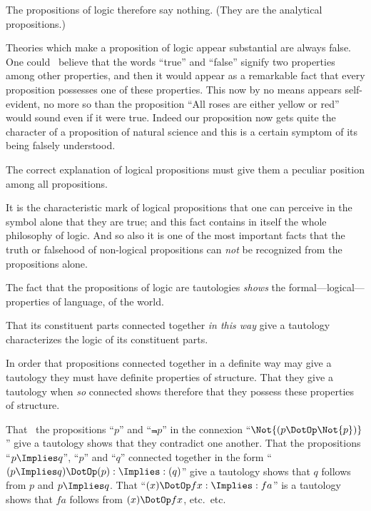 {The propositions of logic therefore say nothing.
(They are the analytical propositions.)}


{Theories which make a proposition of logic
appear substantial are always false. One could
\exempliGratia\ believe that the words ``true'' and ``false''
signify two properties among other properties,
and then it would appear as a remarkable fact
that every proposition possesses one of these
properties. This now by no means appears self-evident,
no more so than the proposition ``All
roses are either yellow or red'' would sound even
if it were true. Indeed our proposition now gets
quite the character of a proposition of natural
science and this is a certain symptom of its being
falsely understood.}


{The correct explanation of logical propositions
must give them a peculiar position among all
propositions.}


{It is the characteristic mark of logical propositions
that one can perceive in the symbol alone
that they are true; and this fact contains in itself
the whole philosophy of logic. And so also it is
one of the most important facts that the truth or
falsehood of non-logical propositions can \emph{not} be
recognized from the propositions alone.}


{The fact that the propositions of logic are
tautologies \emph{shows} the for\-mal---log\-i\-cal---prop\-er\-ties
of language, of the world.

That its constituent parts connected together \emph{in
this way} give a tautology characterizes the logic of
its constituent parts.

In order that propositions connected together
in a definite way may give a tautology they
must have definite properties of structure. That
they give a tautology when \emph{so} connected shows
therefore that they possess these properties of
structure.}


{That \exempliGratia\ the propositions ``$p$'' and ``$\Not{p}$'' in
the connexion ``$\Not{(p \DotOp \Not{p})}$'' give a tautology
shows that they contradict one another. That the
propositions ``$p \Implies q$'', ``$p$'' and ``$q$'' connected
together in the form ``$(p \Implies q) \DotOp (p) : \Implies : (q)$'' give a
tautology shows that $q$ follows from $p$ and $p \Implies q$.
That ``$(x) \DotOp fx : \Implies : fa$'' is a tautology shows that
$fa$ follows from $(x) \DotOp fx$, etc.\ etc.}


